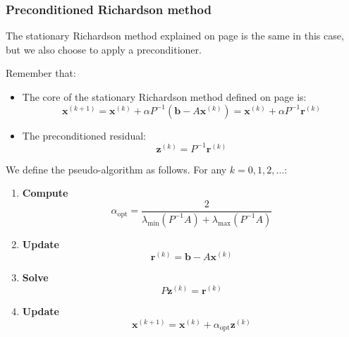 \newpage

\subsubsection{Preconditioned Richardson method}

The stationary Richardson method explained on page \pageref{subsubsection: The stationary Richardson method} is the same in this case, but we also choose to apply a preconditioner.

\highspace
Remember that:
\begin{itemize}
    \item The core of the stationary Richardson method defined on page \pageref{eq: stationary richardson with preconditioner} is:
    \begin{equation*}
        \mathbf{x}^{\left(k+1\right)} = \mathbf{x}^{\left(k\right)} + \alpha P^{-1}\left(\mathbf{b} - A \mathbf{x}^{\left(k\right)}\right) = \mathbf{x}^{\left(k\right)} + \alpha P^{-1}\mathbf{r}^{\left(k\right)}
    \end{equation*}

    \item The preconditioned residual:
    \begin{equation*}
        \mathbf{z}^{\left(k\right)} = P^{-1}\mathbf{r}^{\left(k\right)}
    \end{equation*}
\end{itemize}
We define the pseudo-algorithm as follows. For any $k = 0, 1, 2, \dots$:
\begin{enumerate}
    \item \textbf{Compute}
    \begin{equation*}
        \alpha_{\text{opt}} = \dfrac{2}{\lambda_{\min}\left(P^{-1}A\right) + \lambda_{\max}\left(P^{-1}A\right)}
    \end{equation*}

    \item \textbf{Update}
    \begin{equation*}
        \mathbf{r}^{\left(k\right)} = \mathbf{b} - A\mathbf{x}^{\left(k\right)}
    \end{equation*}

    \item \textbf{Solve}
    \begin{equation*}
        P\mathbf{z}^{\left(k\right)} = \mathbf{r}^{\left(k\right)}
    \end{equation*}

    \item \textbf{Update}
    \begin{equation*}
        \mathbf{x}^{\left(k+1\right)} = \mathbf{x}^{\left(k\right)} + \alpha_{\text{opt}} \mathbf{z}^{\left(k\right)}
    \end{equation*}
\end{enumerate}